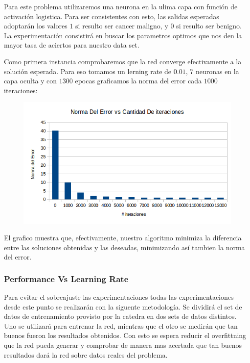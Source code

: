 
Para este problema utilizaremos una neurona en la ulima capa con función de activación logistica. Para ser consistentes con esto, las salidas esperadas adoptarán los valores $1$ si resulto ser cancer maligno, y $0$ si resulto ser benigno. La experimentación consistirá en buscar los parametros optimos que nos den la mayor tasa de aciertos para nuestro data set.

Como primera instancia comprobaremos que la red converge efectivamente a la solución esperada. Para eso tomamos un lerning rate de $0.01$, $7$ neuronas en la capa oculta y con $1300$ epocas graficamos la norma del error cada $1000$ iteraciones:

\begin{figure}[h!]
  \centering
    \includegraphics[scale=0.4]{ej1_convergencia/1.png}
\end{figure}

El grafico muestra que, efectivamente, nuestro algoritmo minimiza la diferencia entre las soluciones obtenidas y las deseadas, minimizando así tambien la norma del error.

\subsubsection{Performance Vs Learning Rate} 

Para evitar el sobreajuste las experimentaciones todas las experimentaciones desde este punto se realizarán con la siguente metodología. Se dividirá el set de datos de entrenamiento provisto por la catedra en dos sets de datos distintos. Uno se utilizará para entrenar la red, mientras que el otro se medirán que tan buenos fueron los resultados obtenidos. Con esto se espera reducir el overfittning que la red pueda generar y comprobar de manera mas acertada que tan buenos resultados dará la red sobre datos reales del problema.

